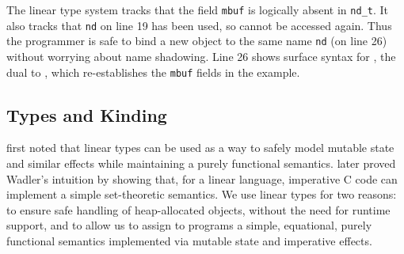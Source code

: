 \documentclass[9pt\ifFinal\else,preprint,nocopyrightspace\fi,\ifAlpha\else natbib,authoryear\fi]{sigplanconf}
\newcommand{\code}[1]{\texttt{#1}}
\begin{document}
The linear type system tracks that the field \code{mbuf} is logically absent
in \code{nd\_t}. It also tracks that \code{nd} on line 19 has been used,
so cannot be accessed again. Thus the programmer is safe to bind a new object
to the same name \code{nd} (on line 26) without worrying about name
shadowing. Line 26 shows surface syntax for , the dual to ,
which re-establishes the \code{mbuf} fields in the example.














\subsection{Types and Kinding}\label{s:kinding}

\citet{Wadler_90} first noted that linear types can be used as a way to safely
model mutable state and similar effects while maintaining a purely functional
semantics.  \citet{Hofmann_00} later proved Wadler's intuition by
showing that, for a linear language, imperative C code can implement a simple
set-theoretic semantics. We use linear types for two reasons: to ensure safe handling of heap-allocated objects, without the need for runtime 
support, and to allow us to assign to \CDSL programs a simple, equational, purely functional semantics implemented via mutable state and imperative effects.
\end{document}
